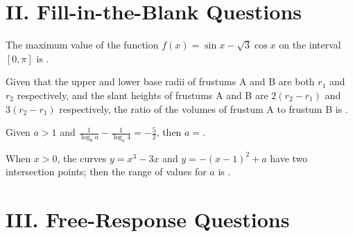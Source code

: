 \documentclass[UTF8,12pt]{ctexart}
\newcommand{\blank}{\underline{\hspace{4em}}}   %
\begin{document}
\section*{II. Fill-in-the-Blank Questions}

\begin{questions}[start=13]

  \item The maximum value of the function $f(x) = \sin x - \sqrt{3} \cos x$ on the
    interval $[0, \pi]$ is \blank.

  \item Given that the upper and lower base radii of frustums A and B are both $r_1$ and
    $r_2$ respectively, and the slant heights of frustums A and B are $2(r_2 - r_1)$ and
    $3(r_2 - r_1)$ respectively, the ratio of the volumes of frustum A to frustum B is
    \blank.

  \item Given $a > 1$ and $\frac{1}{\log_8 a} - \frac{1}{\log_a 4} = -\frac{5}{2}$, then
    $a =$\blank.

  \item When $x > 0$, the curves $y = x^{3} - 3x$ and $y = -(x - 1)^{2} + a$ have two
    intersection points; then the range of values for $a$ is \blank.

\end{questions}

\section*{III. Free-Response Questions}
\end{document}
